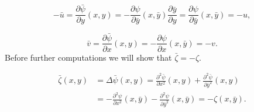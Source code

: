 \begin{equation}
-\bar u=\frac{\partial \bar{\psi}}{\partial y}(x,y)=-\frac{\partial \psi}{\partial \bar y}(x,\bar y)\frac{\partial \bar{y}}{\partial y}=\frac{\partial \psi}{\partial \bar y}(x,\bar y)=-u,
\label{eq:ubar}
\end{equation}

\begin{equation}
\bar v=\frac{\partial \bar{\psi}}{\partial x}(x,y)=-\frac{\partial \psi}{\partial x}(x,\bar y)=-v. \label{eq:vbar}
\end{equation}
Before further computations we will show that $\bar{\zeta}=-\zeta$.

\begin{align}
\bar{\zeta}(x,y) &= \Delta \bar{\psi}(x,y)
=\frac{\partial^2\bar{\psi}}{\partial x^2}(x, y)+\frac{\partial^2\bar{\psi}}{\partial \bar y^2}(x, y) \nonumber \\
&=-\frac{\partial^2\psi}{\partial x^2}(x,\bar y)-\frac{\partial^2\psi}{\partial \bar y^2}(x,\bar y)
=-\zeta(x,\bar y).\label{eq:zetabar}
\end{align}

